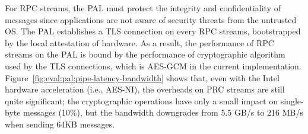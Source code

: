 For RPC streams,
the \sgx{} PAL must protect the integrity and confidentiality of messages since applications
are not aware of security threats from the untrusted OS.
The \sgx{} PAL establishes a TLS connection
on every RPC streams,
bootstrapped by the local attestation of \sgx{} hardware.
As a result,
the performance of RPC streams on the \sgx{} PAL
is bound by the performance
of cryptographic algorithm used by the TLS connections,
which is AES-GCM in the current implementation.
Figure~\ref{fig:eval:pal:pipe-latency-bandwidth}
shows that, even with the Intel hardware acceleration (i.e., AES-NI),
the overheads on PRC streams are still
quite significant;
the cryptographic operations have only a small impact on single-byte messages (\roughly{}10\%),
but the bandwidth downgrades from \roughly{}5.5 GB/s
to \roughly{}216 MB/s when sending 64KB messages.







